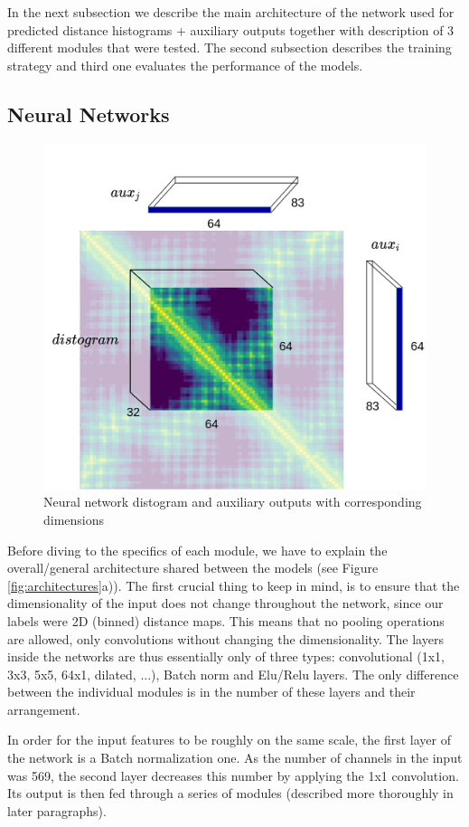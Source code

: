 In the next subsection we describe the main architecture of the network used for predicted distance histograms + auxiliary outputs together with description of 3 different modules that were tested. The second subsection describes the training strategy and third one evaluates the performance of the models.

\subsection{Neural Networks}

\begin{figure}
    \centering
    \includegraphics[width=0.7\linewidth]{imgs_tomas/outputs.png}
    \caption{Neural network distogram and auxiliary outputs with corresponding dimensions}
    \label{fig:outputs}
\end{figure}

Before diving to the specifics of each module, we have to explain the overall/general architecture shared between the models (see Figure \ref{fig:architectures}a)). The first crucial thing to keep in mind, is to ensure that the dimensionality of the input does not change throughout the network, since our labels were 2D (binned) distance maps. This means that no pooling operations are allowed, only convolutions without changing the dimensionality. The layers inside the networks are thus essentially only of three types: convolutional (1x1, 3x3, 5x5, 64x1, dilated, ...), Batch norm and Elu/Relu layers. The only difference between the individual modules is in the number of these layers and their arrangement.

In order for the input features to be roughly on the same scale, the first layer of the network is a Batch normalization one. As the number of channels in the input was 569, the second layer decreases this number by applying the 1x1 convolution. Its output is then fed through a series of modules (described more thoroughly in later paragraphs).

